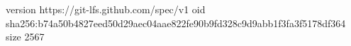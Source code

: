 version https://git-lfs.github.com/spec/v1
oid sha256:b74a50b4827eed50d29aec04aae822fe90b9fd328c9d9abb1f3fa3f5178df364
size 2567

